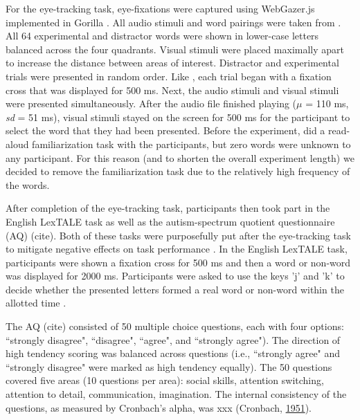 For the eye-tracking task, eye-fixations were captured using WebGazer.js \citep{Papoutsaki} implemented in Gorilla \citep{Anwyl-Irvine_2019}. All audio stimuli and word pairings were taken from \cite{Sulpizio_McQueen_2012}. All 64 experimental and distractor words were shown in lower-case letters balanced across the four quadrants. Visual stimuli were placed maximally apart to increase the distance between areas of interest. Distractor and experimental trials were presented in random order. Like \cite{Sulpizio_McQueen_2012}, each trial began with a fixation cross that was displayed for 500 ms. Next, the audio stimuli and visual stimuli were presented simultaneously. After the audio file finished playing ($\mu$ = 110 ms, \textit{sd} = 51 ms), visual stimuli stayed on the screen for 500 ms for the participant to select the word that they had been presented. Before the experiment, \cite{Sulpizio_McQueen_2012} did a read-aloud familiarization task with the participants, but zero words were unknown to any participant. For this reason (and to shorten the overall experiment length) we decided to remove the familiarization task due to the relatively high frequency of the words.

After completion of the eye-tracking task, participants then took part in the English LexTALE task as well as the autism-spectrum quotient questionnaire (AQ) \citep{Baron-Cohen2001}(cite). Both of these tasks were purposefully put after the eye-tracking task to mitigate negative effects on task performance \citep{Chang_2024}. In the English LexTALE task, participants were shown a fixation cross for 500 ms and then a word or non-word was displayed for 2000 ms. Participants were asked to use the keys 'j' and 'k' to decide whether the presented letters formed a real word or non-word within the allotted time \cite{lemhofer2012introducing}. 

The AQ (cite) consisted of 50 multiple choice questions, each with four options: ``strongly disagree", ``disagree", ``agree", and ``strongly agree"). The direction of high tendency scoring was balanced across questions (i.e., ``strongly agree" and ``strongly disagree" were marked as high tendency equally). The 50 questions covered five areas (10 questions per area): social skills, attention switching, attention to detail, communication, imagination. The internal consistency of the questions, as measured by Cronbach’s alpha, was xxx (Cronbach, \href{https://cognitiveresearchjournal.springeropen.com/articles/10.1186/s41235-022-00439-w\#ref-CR17}{1951}).



